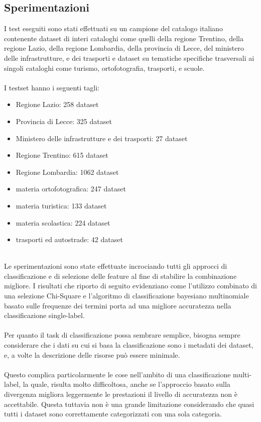 \documentclass{article}
\theoremstyle{plain}
\theoremstyle{definition}
\begin{document}
\subsection{Sperimentazioni}
I test eseguiti sono stati effettuati su un campione del catalogo italiano contenente dataset di interi cataloghi come quelli della regione Trentino, della regione Lazio, della regione Lombardia, della provincia di Lecce, del ministero delle infrastrutture, e dei trasporti e dataset su tematiche specifiche trasversali ai singoli cataloghi come turismo, ortofotografia, trasporti, e scuole.
\\
\\
I testset hanno i seguenti tagli:
\begin{itemize}  
\item Regione Lazio: 258 dataset
\item Provincia di Lecce: 325 dataset
\item Ministero delle infrastrutture e dei trasporti: 27 dataset
\item Regione Trentino: 615 dataset
\item Regione Lombardia: 1062 dataset
\item materia ortofotografica: 247 dataset
\item materia turistica: 133 dataset
\item materia scolastica: 224 dataset
\item trasporti ed autostrade: 42 dataset

\end{itemize}
\phantom
\\
Le sperimentazioni sono state effettuate incrociando tutti gli approcci di classificazione e di selezione delle feature al fine di stabilire la combinazione migliore. I risultati che riporto di seguito evidenziano come l'utilizzo combinato di una selezione Chi-Square e l'algoritmo di classificazione bayesiano multinomiale basato sulle frequenze dei termini porta ad una migliore accuratezza nella classificazione single-label.
\\
\\
Per quanto il task di classificazione possa sembrare semplice, bisogna sempre considerare che i dati su cui si basa la classificazione sono i metadati dei dataset, e, a volte la descrizione delle risorse può essere minimale. 
\\
\\
Questo complica particolarmente le cose nell'ambito di una classificazione multi-label, la quale, risulta molto difficoltosa, anche se l'approccio basato sulla divergenza migliora leggermente le prestazioni il livello di accuratezza non è accettabile. Questa tuttavia non è una grande limitazione considerando che quasi tutti i dataset sono correttamente categorizzati con una sola categoria.
\newpage
\end{document}

